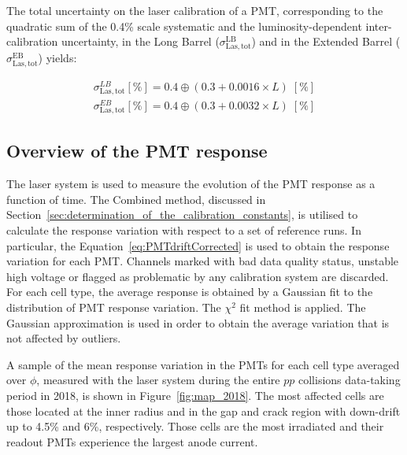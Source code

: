 The total uncertainty on the laser calibration of a PMT, corresponding to the quadratic sum of the 0.4\% scale systematic and the luminosity-dependent inter-calibration uncertainty, in the Long Barrel ($\sigma_{\mathrm{Las,tot}}^{\mathrm{LB}}$) and in the Extended Barrel ($\sigma_{\mathrm{Las,tot}}^{\mathrm{EB}}$) yields:

\begin{equation}
\begin{aligned}
\sigma_{\mathrm{Las,tot}}^{LB} [\%] =0.4\oplus(0.3+0.0016\times L)\; [\%] \\
\sigma_{\mathrm{Las,tot}}^{EB} [\%] =0.4\oplus(0.3+0.0032\times L)\; [\%]
\end{aligned}
\end{equation}

\subsection{Overview of the PMT response}
The laser system is used to measure the evolution of the PMT response as a function of time. 
The Combined method, discussed in Section~\ref{sec:determination_of_the_calibration_constants}, is utilised to calculate the response variation with respect to a set of reference runs. In particular, the Equation~\ref{eq:PMTdriftCorrected} is used to obtain the response variation for each PMT. 
Channels marked with bad data quality status, unstable high voltage or flagged as problematic by any calibration system are discarded. For each cell type, the average response is obtained by a Gaussian fit to the distribution of PMT response variation. The $\chi ^2$ fit method is applied. The Gaussian approximation is used in order to obtain the average variation that is not affected by outliers. 

A sample of the mean response variation in the PMTs for each cell type averaged over $\phi$, measured with the laser system during the entire $pp$ collisions data-taking period in 2018, is shown in Figure~\ref{fig:map_2018}. The most affected cells are those located at the inner radius and in the gap and crack region with down-drift up to 4.5\% and 6\%, respectively. Those cells are the most irradiated and their readout PMTs experience the largest anode current. 

